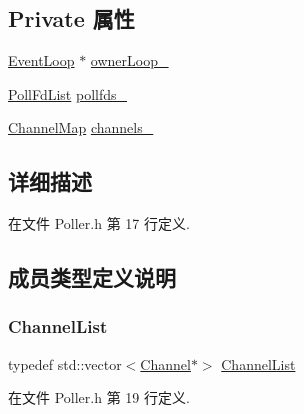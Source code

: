 \subsection*{Private 属性}
\begin{DoxyCompactItemize}
\item 
\hyperlink{classmuduo_1_1EventLoop}{Event\+Loop} $\ast$ \hyperlink{classmuduo_1_1Poller_ab7cf856df3fd0f8496fcf3b59b8a24ab}{owner\+Loop\+\_\+}
\item 
\hyperlink{classmuduo_1_1Poller_a0cf1be2f572740022edada139cacfb12}{Poll\+Fd\+List} \hyperlink{classmuduo_1_1Poller_abbd39d01f8545e75e218de725997abc3}{pollfds\+\_\+}
\item 
\hyperlink{classmuduo_1_1Poller_a950db725d18ce33d8457ae784380a07e}{Channel\+Map} \hyperlink{classmuduo_1_1Poller_aca6f39ba1cb9dbdd28edf2291d1b4fd5}{channels\+\_\+}
\end{DoxyCompactItemize}


\subsection{详细描述}


在文件 Poller.\+h 第 17 行定义.



\subsection{成员类型定义说明}
\mbox{\label{classmuduo_1_1Poller_a0b74248ffee6df294563618187b52404}} 
\subsubsection{\texorpdfstring{Channel\+List}{ChannelList}}
{\footnotesize\ttfamily typedef std\+::vector$<$\hyperlink{classmuduo_1_1Channel}{Channel}$\ast$$>$ \hyperlink{classmuduo_1_1Poller_a0b74248ffee6df294563618187b52404}{Channel\+List}}



在文件 Poller.\+h 第 19 行定义.

\mbox{\label{classmuduo_1_1Poller_a950db725d18ce33d8457ae784380a07e}} 
